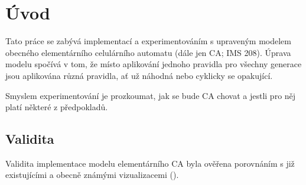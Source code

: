 \section{Úvod}
Tato práce se zabývá implementací a experimentováním
s upraveným modelem obecného elementárního celulárního automatu
(dále jen CA; IMS 208).
Úprava modelu spočívá v tom, že místo aplikování jednoho pravidla
pro všechny generace jsou aplikována různá pravidla, ať už náhodná
nebo cyklicky se opakující.

Smyslem experimentování je prozkoumat, jak se bude CA chovat
a jestli pro něj platí některé z předpokladů.

\subsection{Validita}
Validita implementace modelu elementárního CA byla ověřena porovnáním
s již existujícími a obecně známými vizualizacemi (\cite{ECA}).
